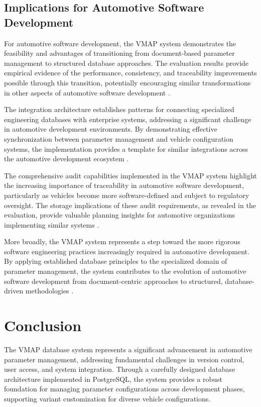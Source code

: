 \subsection{Implications for Automotive Software Development}
\label{subsec:automotive-development-implications}

For automotive software development, the \ac{VMAP} system demonstrates the feasibility and advantages of transitioning from document-based parameter management to structured database approaches. The evaluation results provide empirical evidence of the performance, consistency, and traceability improvements possible through this transition, potentially encouraging similar transformations in other aspects of automotive software development \cite{broy2006challenges}.

The integration architecture establishes patterns for connecting specialized engineering databases with enterprise systems, addressing a significant challenge in automotive development environments. By demonstrating effective synchronization between parameter management and vehicle configuration systems, the implementation provides a template for similar integrations across the automotive development ecosystem \cite{hohpe2002enterprise}.

The comprehensive audit capabilities implemented in the \ac{VMAP} system highlight the increasing importance of traceability in automotive software development, particularly as vehicles become more software-defined and subject to regulatory oversight. The storage implications of these audit requirements, as revealed in the evaluation, provide valuable planning insights for automotive organizations implementing similar systems \cite{staron2021automotive}.

More broadly, the \ac{VMAP} system represents a step toward the more rigorous software engineering practices increasingly required in automotive development. By applying established database principles to the specialized domain of parameter management, the system contributes to the evolution of automotive software development from document-centric approaches to structured, database-driven methodologies \cite{pretschner2007software}.

\section{Conclusion}
\label{sec:final-conclusion}

The \ac{VMAP} database system represents a significant advancement in automotive parameter management, addressing fundamental challenges in version control, user access, and system integration. Through a carefully designed database architecture implemented in PostgreSQL, the system provides a robust foundation for managing parameter configurations across development phases, supporting variant customization for diverse vehicle configurations.

